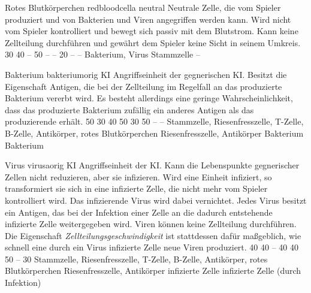 \cellentry
  {Rotes Blutkörperchen}
  {redbloodcella}
  {neutral}
  {Neutrale Zelle, die vom Spieler produziert und von Bakterien und Viren
   angegriffen werden kann. Wird nicht vom Spieler kontrolliert und bewegt
   sich passiv mit dem Blutstrom. Kann keine Zellteilung durchführen und
   gewährt dem Spieler keine Sicht in seinem Umkreis.
  }
  {30} %
  {40} %
  {--} %
  {50} %
  {--} %
\cellentryctd
  {--} %
  {20} %
  {--} %
  {--} %
  {Bakterium, Virus} %
  {Stammzelle} %
  {--} %

\cellentry
  {Bakterium}
  {bakteriumorig}
  {KI}
  {Angriffseinheit der gegnerischen KI. Besitzt die Eigenschaft Antigen, die
   bei der Zellteilung im Regelfall an das produzierte Bakterium vererbt
   wird. Es besteht allerdings eine geringe Wahrscheinlichkeit, dass das
   produzierte Bakterium zufällig ein anderes Antigen als das produzierende
   erhält.
  }
  {50} %
  {30} %
  {40} %
  {50} %
  {30} %
\cellentryctd
  {50} %
  {--} %
  {--} %
  {Stammzelle, Riesenfresszelle, T-Zelle, B-Zelle, Antikörper, rotes Blutkörperchen} %
  {Riesenfresszelle, Antikörper} %
  {Bakterium} %
  {Bakterium} %

\cellentry
  {Virus}
  {virusaorig}
  {KI}
  {Angriffseinheit der KI. Kann die Lebenspunkte gegnerischer Zellen nicht
   reduzieren, aber sie infizieren. Wird eine Einheit infiziert, so
   transformiert sie sich in eine infizierte Zelle, die nicht mehr vom
   Spieler kontrolliert wird. Das infizierende Virus wird dabei vernichtet.
   Jedes Virus besitzt ein Antigen, das bei
   der Infektion einer Zelle an die dadurch entstehende infizierte Zelle
   weitergegeben wird. Viren können keine Zellteilung durchführen. Die
   Eigenschaft \emph{Zellteilungsgeschwindigkeit} ist stattdessen dafür
   maßgeblich, wie schnell eine durch ein Virus infizierte Zelle neue
   Viren produziert.
  }
  {40} %
  {40} %
  {--} %
  {40} %
  {40} %
\cellentryctd
  {50} %
  {--} %
  {30} %
  {Stammzelle, Riesenfresszelle, T-Zelle, B-Zelle, Antikörper, rotes Blutkörperchen} %
  {Riesenfresszelle, Antikörper} %
  {infizierte Zelle} %
  {infizierte Zelle (durch Infektion)} %

